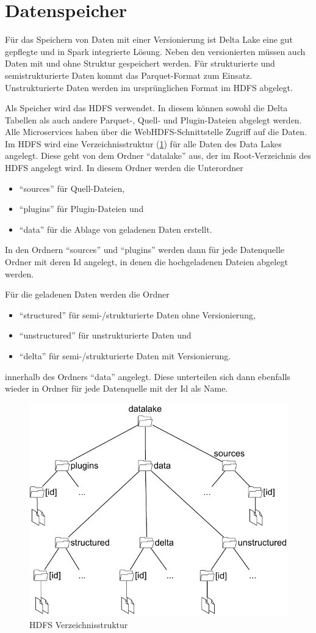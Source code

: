 \section{Datenspeicher}

Für das Speichern von Daten mit einer Versionierung ist Delta Lake eine gut gepflegte und in Spark integrierte Lösung.
Neben den versionierten müssen auch Daten mit und ohne Struktur gespeichert werden.
Für strukturierte und semistrukturierte Daten kommt das Parquet-Format zum Einsatz.
Unstrukturierte Daten werden im ursprünglichen Format im HDFS abgelegt.

Als Speicher wird das HDFS verwendet.
In diesem können sowohl die Delta Tabellen als auch andere Parquet-, Quell- und Plugin-Dateien abgelegt werden.
Alle Microservices haben über die WebHDFS-Schnittstelle Zugriff auf die Daten.
Im HDFS wird eine Verzeichnisstruktur (\cref{fig:hdfs-folder}) für alle Daten des Data Lakes angelegt.
Diese geht von dem Ordner "`datalake"' aus, der im Root-Verzeichnis des HDFS angelegt wird.
In diesem Ordner werden die Unterordner
\begin{itemize}
    \item "`sources"' für Quell-Dateien,
    \item "`plugins"' für Plugin-Dateien und
    \item "`data"' für die Ablage von geladenen Daten erstellt.
\end{itemize}

In den Ordnern "`sources"' und "`plugins"' werden dann für jede Datenquelle Ordner mit deren Id angelegt, in denen die hochgeladenen Dateien abgelegt werden.

Für die geladenen Daten werden die Ordner \begin{itemize}
    \item "`structured"' für semi-/strukturierte Daten ohne Versionierung,
    \item "`unstructured"' für unstrukturierte Daten und 
    \item "`delta"' für semi-/strukturierte Daten mit Versionierung.
\end{itemize}
innerhalb des Ordners "`data"' angelegt.
Diese unterteilen sich dann ebenfalls wieder in Ordner für jede Datenquelle mit der Id als Name.

\begin{figure}
    \centering
    \includegraphics[width=.6\textwidth]{Grafiken/Umsetzung-Verzeichnisse.pdf}
    \caption{HDFS Verzeichnisstruktur}
    \label{fig:hdfs-folder}
\end{figure}